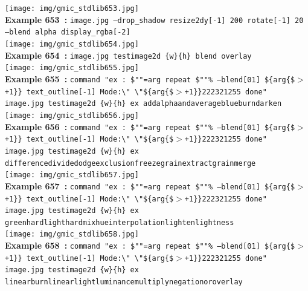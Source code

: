 \documentclass[a4paper,10.5pt,twoside]{book}
\def\comma{\discretionary{,}{}{,}}
\begin{document}
\begin{center}\texttt{[image: img/gmic\_stdlib653.jpg]}\\
{\footnotesize \textbf{Example 653~:} \texttt{image.jpg --drop\_shadow {\comma} resize2dy[-1] 200 rotate[-1] 20 --blend alpha display\_rgba[-2]}}
\\\texttt{[image: img/gmic\_stdlib654.jpg]}\\
{\footnotesize \textbf{Example 654~:} \texttt{image.jpg testimage2d \{w\}{\comma}\{h\} blend overlay}}
\\\texttt{[image: img/gmic\_stdlib655.jpg]}\\
{\footnotesize \textbf{Example 655~:} \texttt{command "ex : \$""=arg repeat \$""\% --blend[0{\comma}1] \$\{arg\{\$$>$+1\}\} text\_outline[-1] Mode:\textbackslash " \textbackslash "\$\{arg\{\$$>$+1\}\}{\comma}2{\comma}2{\comma}23{\comma}2{\comma}1{\comma}255 done" image.jpg testimage2d \{w\}{\comma}\{h\} ex add{\comma}alpha{\comma}and{\comma}average{\comma}blue{\comma}burn{\comma}darken}}
\\\texttt{[image: img/gmic\_stdlib656.jpg]}\\
{\footnotesize \textbf{Example 656~:} \texttt{command "ex : \$""=arg repeat \$""\% --blend[0{\comma}1] \$\{arg\{\$$>$+1\}\} text\_outline[-1] Mode:\textbackslash " \textbackslash "\$\{arg\{\$$>$+1\}\}{\comma}2{\comma}2{\comma}23{\comma}2{\comma}1{\comma}255 done" image.jpg testimage2d \{w\}{\comma}\{h\} ex difference{\comma}divide{\comma}dodge{\comma}exclusion{\comma}freeze{\comma}grainextract{\comma}grainmerge}}
\\\texttt{[image: img/gmic\_stdlib657.jpg]}\\
{\footnotesize \textbf{Example 657~:} \texttt{command "ex : \$""=arg repeat \$""\% --blend[0{\comma}1] \$\{arg\{\$$>$+1\}\} text\_outline[-1] Mode:\textbackslash " \textbackslash "\$\{arg\{\$$>$+1\}\}{\comma}2{\comma}2{\comma}23{\comma}2{\comma}1{\comma}255 done" image.jpg testimage2d \{w\}{\comma}\{h\} ex green{\comma}hardlight{\comma}hardmix{\comma}hue{\comma}interpolation{\comma}lighten{\comma}lightness}}
\\\texttt{[image: img/gmic\_stdlib658.jpg]}\\
{\footnotesize \textbf{Example 658~:} \texttt{command "ex : \$""=arg repeat \$""\% --blend[0{\comma}1] \$\{arg\{\$$>$+1\}\} text\_outline[-1] Mode:\textbackslash " \textbackslash "\$\{arg\{\$$>$+1\}\}{\comma}2{\comma}2{\comma}23{\comma}2{\comma}1{\comma}255 done" image.jpg testimage2d \{w\}{\comma}\{h\} ex linearburn{\comma}linearlight{\comma}luminance{\comma}multiply{\comma}negation{\comma}or{\comma}overlay}}

\end{center}
\end{document}
